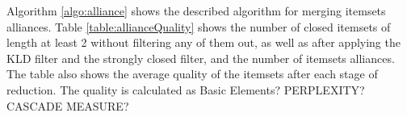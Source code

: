 \documentclass{sig-alternate}
\begin{document}



Algorithm \ref{algo:alliance} shows the described algorithm for merging itemsets alliances. Table  \ref{table:allianceQuality} shows the number of closed itemsets of length at least 2 without filtering any of them out, as well as after applying the KLD filter and the strongly closed filter, and the number of itemsets alliances. The table also shows the average quality of the itemsets after each stage of reduction. The quality is calculated as Basic Elements? PERPLEXITY? CASCADE MEASURE? 
\end{document}
